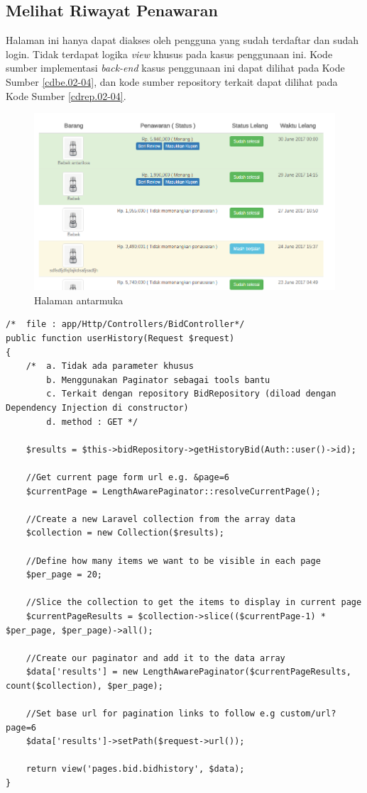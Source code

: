 \subsection{Melihat Riwayat Penawaran}
Halaman ini hanya dapat diakses oleh pengguna yang sudah terdaftar dan sudah login. Tidak terdapat logika \textit{view} khusus pada kasus penggunaan ini. Kode sumber implementasi \textit{back-end} kasus penggunaan ini dapat dilihat pada Kode Sumber \ref{cdbe.02-04}, dan kode sumber repository terkait dapat dilihat pada Kode Sumber \ref{cdrep.02-04}.

\begin{figure}[H]
    \centering
    \includegraphics[width=\textwidth]{images/bab4/ui/02-04.png}
    \caption{Halaman antarmuka }
    \label{ui.02-04}
\end{figure}

\begin{lstlisting}[label=cdbe.02-04,style=php,caption=Implementasi \textit{Back-end} Kasus Penggunaan: Melihat Riwayat Penawaran]
/*	file : app/Http/Controllers/BidController*/
public function userHistory(Request $request)
{
    /*  a. Tidak ada parameter khusus
        b. Menggunakan Paginator sebagai tools bantu
        c. Terkait dengan repository BidRepository (diload dengan Dependency Injection di constructor)
        d. method : GET */

    $results = $this->bidRepository->getHistoryBid(Auth::user()->id);
    
    //Get current page form url e.g. &page=6
    $currentPage = LengthAwarePaginator::resolveCurrentPage();

    //Create a new Laravel collection from the array data
    $collection = new Collection($results);

    //Define how many items we want to be visible in each page
    $per_page = 20;

    //Slice the collection to get the items to display in current page
    $currentPageResults = $collection->slice(($currentPage-1) * $per_page, $per_page)->all();

    //Create our paginator and add it to the data array
    $data['results'] = new LengthAwarePaginator($currentPageResults, count($collection), $per_page);

    //Set base url for pagination links to follow e.g custom/url?page=6
    $data['results']->setPath($request->url());

    return view('pages.bid.bidhistory', $data);
}
\end{lstlisting}

